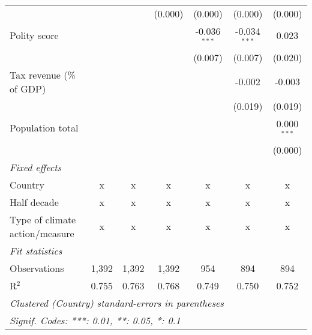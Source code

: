 \begin{tabular}{lcccccc}
                                                                               &         &               & (0.000)        & (0.000)        & (0.000)        & (0.000)\\   
   Polity score                                                                &         &               &                & -0.036$^{***}$ & -0.034$^{***}$ & 0.023\\   
                                                                               &         &               &                & (0.007)        & (0.007)        & (0.020)\\   
   Tax revenue (\% of GDP)                                                     &         &               &                &                & -0.002         & -0.003\\   
                                                                               &         &               &                &                & (0.019)        & (0.019)\\   
   Population total                                                            &         &               &                &                &                & 0.000$^{***}$\\   
                                                                               &         &               &                &                &                & (0.000)\\   
   \emph{Fixed effects}\\
   Country                                                                     & x       & x             & x              & x              & x              & x\\  
   Half decade                                                                 & x       & x             & x              & x              & x              & x\\  
   Type of climate action/measure                                              & x       & x             & x              & x              & x              & x\\  
   \midrule \emph{Fit statistics}\\
   Observations                                                                & 1,392   & 1,392         & 1,392          & 954            & 894            & 894\\  
   R$^2$                                                                       & 0.755   & 0.763         & 0.768          & 0.749          & 0.750          & 0.752\\  
   \midrule
   \multicolumn{7}{l}{\emph{Clustered (Country) standard-errors in parentheses}}\\
   \multicolumn{7}{l}{\emph{Signif. Codes: ***: 0.01, **: 0.05, *: 0.1}}\\
\end{tabular}
\par\endgroup


